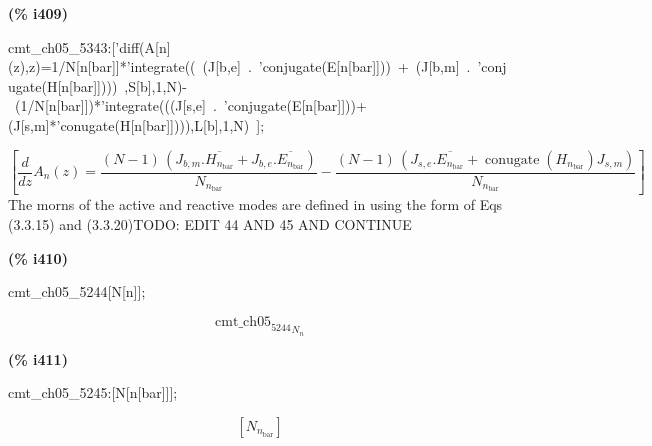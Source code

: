 \documentclass[fleqn]{article}
\begin{document}
\noindent
\begin{minipage}[t]{4.000000em}\color{red}\bfseries
(\% i409)	
\end{minipage}
\begin{minipage}[t]{\textwidth}\color{blue}
cmt\_ch05\_5343:['diff(A[n](z),z)=1/N[n[bar]]*'integrate((\ (J[b,e]\ .\ 'conjugate(E[n[bar]]))\ +\ (J[b,m]\ .\ 'conjugate(H[n[bar]])))\ ,S[b],1,N)-\ (1/N[n[bar]])*'integrate(((J[s,e]\ .\ 'conjugate(E[n[bar]]))+(J[s,m]*'conugate(H[n[bar]]))),L[b],1,N)\ ];
\end{minipage}
\[\displaystyle \tag{\% o409} 
\operatorname{[}\frac{d}{d z} {A_n}(z)=\frac{\left( N-1\right) \, \left( {J_{b,m}}\ensuremath{\mathrm{ . }}\overline{{H_{{n_{\ensuremath{\mathrm{bar}}}}}}}+{J_{b,e}}\ensuremath{\mathrm{ . }}\overline{{E_{{n_{\ensuremath{\mathrm{bar}}}}}}}\right) }{{N_{{n_{\ensuremath{\mathrm{bar}}}}}}}-
\frac{\left( N-1\right) \, \left( {J_{s,e}}\ensuremath{\mathrm{ . }}\overline{{E_{{n_{\ensuremath{\mathrm{bar}}}}}}}+\operatorname{conugate}\left( {H_{{n_{\ensuremath{\mathrm{bar}}}}}}\right)  {J_{s,m}}\right) }{{N_{{n_{\ensuremath{\mathrm{bar}}}}}}}\operatorname{]}\mbox{}
\]
The morns of the active and reactive modes are defined in using the form of Eqs (3.3.15) and (3.3.20)TODO: EDIT 44 AND 45 AND CONTINUE


\noindent
\begin{minipage}[t]{4.000000em}\color{red}\bfseries
(\% i410)	
\end{minipage}
\begin{minipage}[t]{\textwidth}\color{blue}
cmt\_ch05\_5244[N[n]];
\end{minipage}
\[\displaystyle \tag{\% o410} 
{{{{\ensuremath{\mathrm{cmt\_ ch05}}}_{\ensuremath{\mathrm{5244}}}}}_{{N_n}}}\mbox{}
\]


\noindent
\begin{minipage}[t]{4.000000em}\color{red}\bfseries
(\% i411)	
\end{minipage}
\begin{minipage}[t]{\textwidth}\color{blue}
cmt\_ch05\_5245:[N[n[bar]]];
\end{minipage}
\[\displaystyle \tag{\% o411} 
\left[ {N_{{n_{\ensuremath{\mathrm{bar}}}}}}\right] \mbox{}
\]
\end{document}
